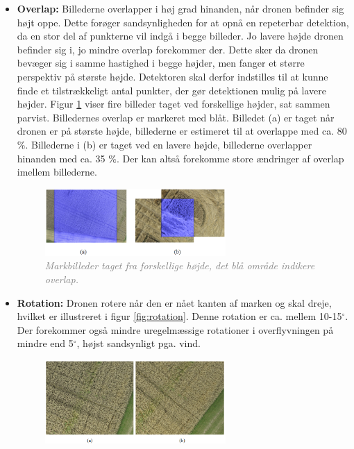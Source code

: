 \begin{itemize}
\item{\textbf{Overlap:} Billederne overlapper i høj grad hinanden, når dronen befinder sig højt oppe. Dette forøger sandsynligheden for at opnå en repeterbar detektion, da en stor del af punkterne vil indgå i begge billeder. Jo lavere højde dronen befinder sig i, jo mindre overlap forekommer der. Dette sker da dronen bevæger sig i samme hastighed i begge højder, men fanger et større perspektiv på største højde. Detektoren skal derfor indstilles til at kunne finde et tilstrækkeligt antal punkter, der gør detektionen mulig på lavere højder. Figur \ref{fig:overlap} viser fire billeder taget ved forskellige højder, sat sammen parvist. Billedernes overlap er markeret med blåt. Billedet (a) er taget når dronen er på største højde, billederne er estimeret til at overlappe med ca. 80 $\%$. Billederne i (b) er taget ved en lavere højde, billederne overlapper hinanden med ca. 35 $\%$. Der kan altså forekomme store ændringer af overlap imellem billederne.
\begin{figure}[H]
    \centering
    \includegraphics[width=0.65\textwidth]{fig/17.png}
     \vspace{-1em}
    \begin{center}    
       \caption{\textcolor{gray}{\footnotesize \textit{Markbilleder taget fra forskellige højde, det blå område indikere overlap.}}}
    \label{fig:overlap}
     \end{center}
     \vspace{-2.5em}
  \end{figure} \noindent }
\item{\textbf{Rotation:} Dronen rotere når den er nået kanten af marken og skal dreje, hvilket er illustreret i figur \ref{fig:rotation}. Denne rotation er ca. mellem 10-15$^{\circ}$. Der forekommer også mindre uregelmæssige rotationer i overflyvningen på mindre end 5$^{\circ}$, højst sandsynligt pga. vind.
\begin{figure}[H]
    \centering
    \includegraphics[width=0.65\textwidth]{fig/19.png}

\end{figure}}
\end{itemize}

